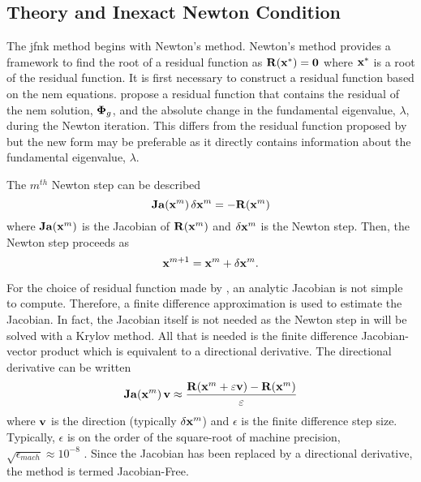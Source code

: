   \subsection{ Theory and Inexact Newton Condition}

    The \gls{jfnk} method begins with Newton's method. Newton's method provides
    a framework to find the root of a residual function as $\mathbf{R}(\mathbf{x}^*) =
    \mathbf{0}$ where $\mathbf{x}^*$ is a root of the residual function. It is first
    necessary to construct a residual function based on the \gls{nem} equations.
    \citeauthor{qe2paper} propose a residual function that contains the residual
    of  the \gls{nem} solution, $\mathbf{\Phi}_g$, and the absolute change in the
    fundamental eigenvalue, $\lambda$, during the Newton iteration. This differs
    from the residual function proposed by \citeauthor{gill_azmy} but the new
    form may be preferable as it directly contains information about the
    fundamental eigenvalue, $\lambda$.
    
    The $m^{th}$ Newton step can be described 
    \begin{equation}
      \label{eq:newton_step}
      \mathbf{Ja} (\mathbf{x}^m) \, \delta\mathbf{x}^m = - \mathbf{R}(\mathbf{x}^m)
    \end{equation}
    where $\mathbf{Ja}(\mathbf{x}^m)$ is the Jacobian of $\mathbf{R}(\mathbf{x}^m)$ and 
    $\delta\mathbf{x}^m$ is the Newton step. Then, the Newton step proceeds as
    \begin{equation}
      \mathbf{x}^{m+1} = \mathbf{x}^{m} + \delta\mathbf{x}^{m}.
    \end{equation}

    For the choice of residual function made by \citeauthor{qe2paper}, an 
    analytic Jacobian is not simple to compute. Therefore, a finite difference
    approximation is used to estimate the Jacobian. In fact, the Jacobian itself
    is not needed as the Newton step in  will be solved
    with a Krylov method. All that is needed is the finite difference
    Jacobian-vector product which is equivalent to a directional derivative. The
    directional derivative can be written
    \begin{equation}
      \label{eq:dirder}
      \mathbf{Ja}(\mathbf{x}^m) \, \mathbf{v} \approx \frac{\mathbf{R}(\mathbf{x}^m + \varepsilon \mathbf{v}) - 
        \mathbf{R}(\mathbf{x}^m)}{\varepsilon}
    \end{equation}
    where $\mathbf{v}$ is the direction (typically $\delta\mathbf{x}^m$) and $\epsilon$ is the
    finite difference step size. Typically, $\epsilon$ is on the order of
    the square-root of machine precision, 
    $\sqrt{\epsilon_{mach}} \approx 10^{-8}$
    \cite{qe2paper,gill_azmy,textbookkelley}. Since the Jacobian has been
    replaced by a directional derivative, the method is termed Jacobian-Free.

